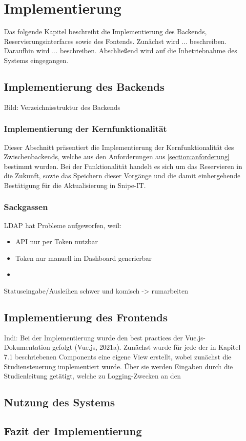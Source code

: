 
\chapter{Implementierung}
\label{chapter-implementierung}
Das folgende Kapitel beschreibt die Implementierung des Backends, Reservierungsinterfaces sowie des
Fontends. Zunächst wird ... beschreiben. Daraufhin wird ... beschreiben. Abschließend wird auf die
Inbetriebnahme des Systems eingegangen.


\section{Implementierung des Backends}
Bild: Verzeichnisstruktur des Backends

\subsection{Implementierung der Kernfunktionalität}
Dieser Abschnitt präsentiert die Implementierung der Kernfunktionalität des Zwischenbackends,
welche aus den Anforderungen aus \ref{section:anforderung} bestimmt wurden. Bei der Funktionalität
handelt es sich um das Reservieren in die Zukunft, sowie das Speichern dieser Vorgänge und die
damit einhergehende Bestätigung für die Aktualisierung in Snipe-IT.


\subsection{Sackgassen}
LDAP hat Probleme aufgeworfen, weil:

\begin{itemize}
  \item API nur per Token nutzbar
  \item Token nur manuell im Dashboard generierbar
  \item 
\end{itemize}
Statuseingabe/Ausleihen schwer und komisch -> rumarbeiten

\section{Implementierung des Frontends}

Indi: Bei der Implementierung wurde den best practices der Vue.js-Dokumentation gefolgt (Vue.js, 2021a).
Zunächst wurde für jede der in Kapitel 7.1 beschriebenen Components eine eigene View erstellt, wobei
zunächst die Studiensteuerung implementiert wurde. Über sie werden Eingaben durch die Studienleitung
getätigt, welche zu Logging-Zwecken an den


\section{Nutzung des Systems}

\section{Fazit der Implementierung}